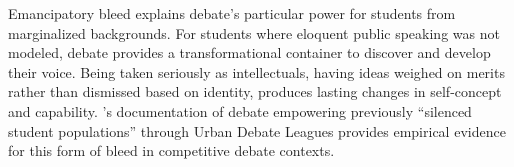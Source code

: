 Emancipatory bleed \parencite{kemper2017battle,kemper2020wyrding} explains debate's particular power for students from marginalized backgrounds. For students where eloquent public speaking was not modeled, debate provides a transformational container \parencite{bowman2021magic} to discover and develop their voice. Being taken seriously as intellectuals, having ideas weighed on merits rather than dismissed based on identity, produces lasting changes in self-concept and capability. \textcite{snider2003gamemaster}'s documentation of debate empowering previously ``silenced student populations'' through Urban Debate Leagues provides empirical evidence for this form of bleed in competitive debate contexts.




